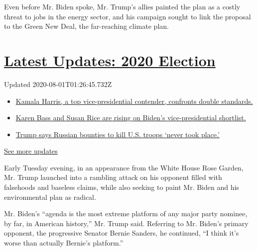 Even before Mr. Biden spoke, Mr. Trump's allies painted the plan as a
costly threat to jobs in the energy sector, and his campaign sought to
link the proposal to the Green New Deal, the far-reaching climate plan.

\hypertarget{latest-updates-2020-election}{%
\section{\texorpdfstring{\href{https://www.nytimes.com/2020/07/31/us/elections/biden-vs-trump.html?action=click\&pgtype=Article\&state=default\&region=MAIN_CONTENT_1\&context=storylines_live_updates}{Latest
Updates: 2020
Election}}{Latest Updates: 2020 Election}}\label{latest-updates-2020-election}}

Updated 2020-08-01T01:26:45.732Z

\begin{itemize}
\tightlist
\item
  \href{https://www.nytimes.com/2020/07/31/us/elections/biden-vs-trump.html?action=click\&pgtype=Article\&state=default\&region=MAIN_CONTENT_1\&context=storylines_live_updates\#link-29fdff45}{Kamala
  Harris, a top vice-presidential contender, confronts double
  standards.}
\item
  \href{https://www.nytimes.com/2020/07/31/us/elections/biden-vs-trump.html?action=click\&pgtype=Article\&state=default\&region=MAIN_CONTENT_1\&context=storylines_live_updates\#link-13ec3d9c}{Karen
  Bass and Susan Rice are rising on Biden's vice-presidential
  shortlist.}
\item
  \href{https://www.nytimes.com/2020/07/31/us/elections/biden-vs-trump.html?action=click\&pgtype=Article\&state=default\&region=MAIN_CONTENT_1\&context=storylines_live_updates\#link-49e9a016}{Trump
  says Russian bounties to kill U.S. troops `never took place.'}
\end{itemize}

\href{https://www.nytimes.com/2020/07/31/us/elections/biden-vs-trump.html?action=click\&pgtype=Article\&state=default\&region=MAIN_CONTENT_1\&context=storylines_live_updates}{See
more updates}

Early Tuesday evening, in an appearance from the White House Rose
Garden, Mr. Trump launched into a rambling attack on his opponent filled
with falsehoods and baseless claims, while also seeking to paint Mr.
Biden and his environmental plan as radical.

Mr. Biden's ``agenda is the most extreme platform of any major party
nominee, by far, in American history,'' Mr. Trump said. Referring to Mr.
Biden's primary opponent, the progressive Senator Bernie Sanders, he
continued, ``I think it's worse than actually Bernie's platform.''

